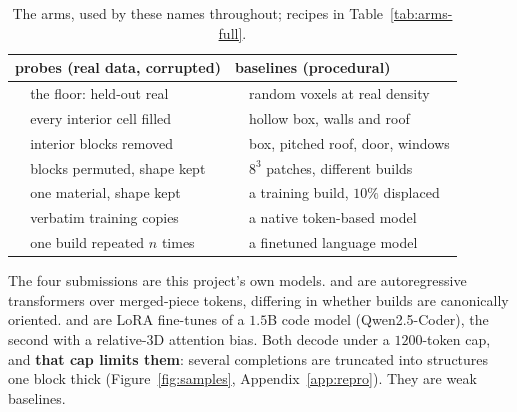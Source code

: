 \begin{table}[!htb]
\centering
\scriptsize
\caption{The arms, used by these names throughout; recipes in Table~\ref{tab:arms-full}.}
\label{tab:arms}
\begin{tabular}{ll@{\hspace{1.2em}}ll}
\toprule
\multicolumn{2}{l}{\textbf{probes} (real data, corrupted)} & \multicolumn{2}{l}{\textbf{baselines} (procedural)} \\
\midrule
\realheld{}     & the floor: held-out real     & \randomvox{}   & random voxels at real density \\
\solidify{}     & every interior cell filled   & \hollowbox{}   & hollow box, walls and roof \\
\hollow{}       & interior blocks removed      & \gabled{}      & box, pitched roof, door, windows \\
\matshuffle{}   & blocks permuted, shape kept  & \patchstitch{} & $8^3$ patches, different builds \\
\monochrome{}   & one material, shape kept     & \copynoise{}   & a training build, $10\%$ displaced \\
\traincopy{}    & verbatim training copies     & \voxar{} & a native token-based model \\
\singlemode{}   & one build repeated $n$ times & \llmft{} & a finetuned language model \\
\bottomrule
\end{tabular}
\end{table}

The four submissions are this project's own models. \voxar{} and \voxarun{} are
autoregressive transformers over merged-piece tokens, differing in whether builds are
canonically oriented. \llmft{} and \llmgeo{} are LoRA fine-tunes of a $1.5$B code model
(Qwen2.5-Coder), the second with a relative-{3D} attention bias. Both decode under a
$1200$-token cap, and \textbf{that cap limits them}: several completions are truncated
into structures one block thick (Figure~\ref{fig:samples}, Appendix~\ref{app:repro}).
They are weak baselines.

